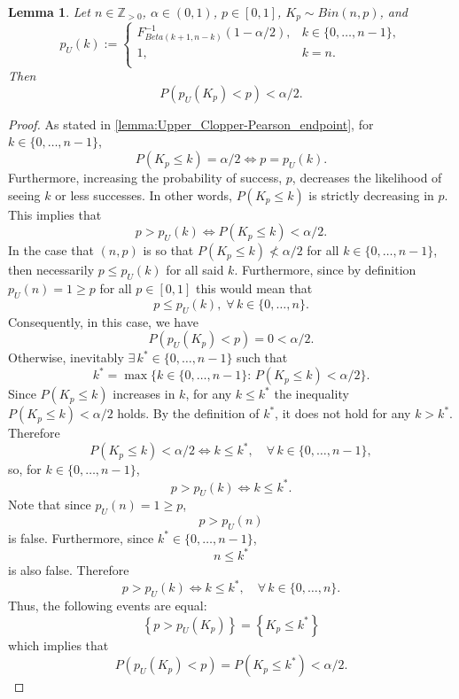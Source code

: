 \documentclass{article}
\newtheorem{lemma}{Lemma}
\begin{document}
\begin{lemma}\label{lemma:upper-endpoint-probability-inequality}
Let $n\in\mathbb{Z}_{>0}$, $\alpha\in(0,1)$, $p\in[0,1]$, $K_p\sim Bin(n,p)$, and 
$$p_U(k):= \begin{cases}
    F^{-1}_{Beta(k+1,n-k)}(1-\alpha/2), &k\in\{0,\ldots,n-1\},\\
    1, &k=n.\\
\end{cases}$$
Then
$$P(p_U(K_p)<p)<\alpha/2.$$
\end{lemma}
\begin{proof}
As stated in \autoref{lemma:Upper_Clopper-Pearson_endpoint}, for $k\in\{0,\ldots,n-1\}$, 
$$P(K_p\leq k)=\alpha/2 \Leftrightarrow p=p_U(k).$$
Furthermore, increasing the probability of success, $p$, decreases the likelihood of seeing $k$ or less successes. In other words, $P(K_p \leq k)$ is strictly decreasing in $p$.
This implies that 
$$p>p_U(k) \Leftrightarrow P(K_p \leq k)<\alpha/2.$$
In the case that $(n,p)$ is so that $P(K_p\leq k) \nless \alpha/2$ for all $k\in\{0,\ldots,n-1\}$, then necessarily $p\leq p_U(k)$ for all said $k$.
Furthermore, since by definition $p_U(n)=1 \geq p$ for all $p\in [0,1]$ this would mean that
$$p\leq p_U(k),\;\forall \,k\in \{0,\ldots, n\}.$$
Consequently, in this case, we have
$$P(p_U(K_p)<p)=0<\alpha/2.$$
Otherwise, inevitably $\exists\, k^*\in\{0,\ldots,n-1\}$ such that
$$k^*=\max\{k\in\{0,\ldots,n-1\}:\,P(K_p\leq k)<\alpha/2\}.$$
Since $P(K_p\leq k)$ increases in $k$, for any $k\leq k^*$ the inequality $P(K_p \leq k)<\alpha /2$ holds. By the definition of $k^*$, it does not hold for any $k>k^*$. Therefore
$$P(K_p \leq k) <\alpha /2 \Leftrightarrow k\leq k^*,\quad\forall\,k\in\{0,\ldots,n-1\},$$
so, for $k\in\{0,\ldots,n-1\}$,
$$p>p_U(k)\Leftrightarrow k\leq k^*.$$
Note that since $p_U(n)=1\geq p$,
$$p>p_U(n)$$
is false. Furthermore, since $k^*\in\{0,\ldots,n-1\}$,
$$n\leq k^*$$
is also false. Therefore
$$p>p_U(k)\Leftrightarrow k\leq k^*,\quad\forall\,k\in\{0,\ldots,n\}.$$
Thus, the following events are equal:
$$\left\{p>p_U(K_p)\right\}=\left\{K_p\leq k^*\right\}$$
which implies that
$$P(p_U(K_p)<p)=P(K_p\leq k^*)<\alpha/2.$$
\end{proof}
\end{document}
